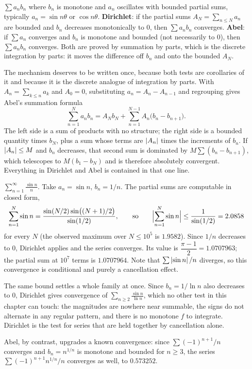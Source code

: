 \cue $\sum a_nb_n$ where $b_n$ is monotone and $a_n$ oscillates with bounded partial sums, typically $a_n=\sin n\theta$ or $\cos n\theta$.
\method \textbf{Dirichlet}: if the partial sums $A_N=\sum_{n\leq N}a_n$ are bounded and $b_n$ decreases monotonically to $0$, then $\sum a_nb_n$ converges. \textbf{Abel}: if $\sum a_n$ converges and $b_n$ is monotone and bounded (not necessarily to $0$), then $\sum a_nb_n$ converges. Both are proved by summation by parts, which is the discrete integration by parts: it moves the difference off $b_n$ and onto the bounded $A_N$.

The mechanism deserves to be written once, because both tests are corollaries of it and because it is the discrete analogue of integration by parts. With $A_n=\sum_{k\leq n}a_k$ and $A_0=0$, substituting $a_n=A_n-A_{n-1}$ and regrouping gives Abel's summation formula
\[\sum_{n=1}^{N}a_nb_n=A_Nb_N+\sum_{n=1}^{N-1}A_n\bigl(b_n-b_{n+1}\bigr).\]
The left side is a sum of products with no structure; the right side is a bounded quantity times $b_N$, plus a sum whose terms are $\left\lvert A_n\right\rvert$ times the increments of $b_n$. If $\left\lvert A_n\right\rvert\leq M$ and $b_n$ decreases, that second sum is dominated by $M\sum(b_n-b_{n+1})$, which telescopes to $M(b_1-b_N)$ and is therefore absolutely convergent. Everything in Dirichlet and Abel is contained in that one line.

\begin{worked}
$\displaystyle\sum_{n=1}^{\infty}\frac{\sin n}{n}$. Take $a_n=\sin n$, $b_n=1/n$. The partial sums are computable in closed form,
\[\sum_{n=1}^{N}\sin n=\frac{\sin(N/2)\sin\bigl((N+1)/2\bigr)}{\sin(1/2)},\qquad\text{so}\qquad\Bigl|\sum_{n=1}^{N}\sin n\Bigr|\leq\frac{1}{\sin(1/2)}=2.0858\]
for every $N$ (the observed maximum over $N\leq10^5$ is $1.9582$). Since $1/n$ decreases to $0$, Dirichlet applies and the series converges. Its value is $\dfrac{\pi-1}{2}=1.0707963$; the partial sum at $10^7$ terms is $1.0707964$. Note that $\sum\left\lvert \sin n\right\rvert/n$ diverges, so this convergence is conditional and purely a cancellation effect.

The same bound settles a whole family at once. Since $b_n=1/\ln n$ also decreases to $0$, Dirichlet gives convergence of $\displaystyle\sum_{n\geq2}\frac{\sin n}{\ln n}$, which no other test in this chapter can touch: the magnitudes are nowhere near summable, the signs do not alternate in any regular pattern, and there is no monotone $f$ to integrate. Dirichlet is the test for series that are held together by cancellation alone.

Abel, by contrast, upgrades a known convergence: since $\sum(-1)^{n+1}/n$ converges and $b_n=n^{1/n}$ is monotone and bounded for $n\geq3$, the series $\sum(-1)^{n+1}n^{1/n}/n$ converges as well, to $0.573252$.
\end{worked}


